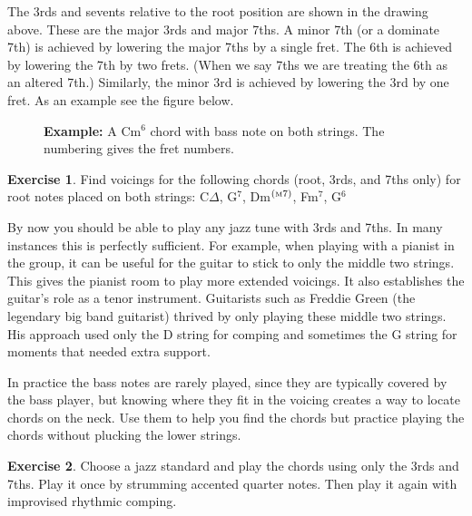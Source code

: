 \documentclass[12pt]{article}
\theoremstyle{definition}
\newtheorem{exercise}{Exercise}
\begin{document}
The 3rds and sevents relative to the root position are shown in the drawing above. 
These are the major 3rds and major 7ths. A minor 7th (or a dominate 7th) is achieved by lowering the major 7ths by a single fret. The 6th is achieved by lowering the 7th by two frets. (When we say 7ths we are treating the 6th as an altered 7th.) Similarly, the minor 3rd is achieved by lowering the 3rd by one fret. As an example see the figure below. 

\begin{figure}[H]
\noindent
\textbf{Example:} A Cm$^6$ chord with bass note on both strings. The numbering gives the fret numbers. 

\noindent
\begin{minipage}{0.5\textwidth}
\end{minipage}
\begin{minipage}{0.5\textwidth}
\end{minipage}
\end{figure}


\begin{exercise}
Find voicings for the following chords (root, 3rds, and 7ths only) for root notes placed on both strings: C$\Delta$, G$^7$, Dm$^{(\textrm {\tiny M} 7)}$, Fm$^7$, G$^6$
\end{exercise}

By now you should be able to play any jazz tune with 3rds and 7ths. In many instances this is perfectly sufficient. For example, when playing with a pianist in the group, it can be useful for the guitar to stick to only the middle two strings. 
This gives the pianist room to play more extended voicings. It also establishes the guitar's role as a tenor instrument. 
Guitarists such as Freddie Green (the legendary big band guitarist) thrived by only playing these middle two strings. His approach used only the D string for comping and sometimes the G string for moments that needed extra support. 

In practice the bass notes are rarely played, since they are typically covered by the bass player, but knowing where they fit in the voicing creates a way to locate chords on the neck. Use them to help you find the chords but practice playing the chords without plucking the lower strings. 

\begin{exercise} \label{ex:chunking}
Choose a jazz standard and play the chords using only the 3rds and 7ths. 
Play it once by strumming accented quarter notes. Then play it again with improvised rhythmic comping. 
\end{exercise}
\end{document}
